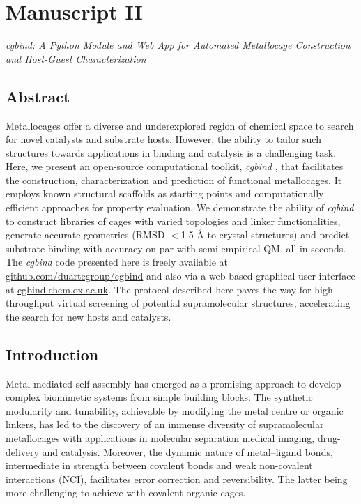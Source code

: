 \documentclass[../../main.tex]{subfiles}
\newcommand{\cgbind}{\emph{cgbind }}
\begin{document}
\section{Manuscript II}
\emph{cgbind: A Python Module and Web App for Automated Metallocage Construction and Host-Guest Characterization}


\subsection{Abstract}

Metallocages offer a diverse and underexplored region of chemical space to search for novel catalysts and substrate hosts. However, the ability to tailor such structures towards applications in binding and catalysis is a challenging task. Here, we present an open-source computational toolkit, \cgbind, that facilitates the construction, characterization and prediction of functional metallocages. It employs known structural scaffolds as starting points and computationally efficient approaches for property evaluation. We demonstrate the ability of \cgbind to construct libraries of cages with varied topologies and linker functionalities, generate accurate geometries (RMSD $<$1.5 Å to crystal structures) and predict substrate binding with accuracy on-par with semi-empirical QM, all in seconds. The \cgbind code presented here is freely available at {\url{github.com/duartegroup/cgbind}} and also via a web-based graphical user interface at \url{cgbind.chem.ox.ac.uk}. The protocol described here paves the way for high-throughput virtual screening of potential supramolecular structures, accelerating the search for new hosts and catalysts. 


\subsection{Introduction}

Metal-mediated self-assembly has emerged as a promising approach to develop complex biomimetic systems from simple building blocks. The synthetic modularity and tunability, achievable by modifying the metal centre or organic linkers, has led to the discovery of an immense diversity of supramolecular metallocages with applications in molecular separation\cite{Garcia-Simon2016, Chen2015} medical imaging,\cite{Pothig2019, Burke2018} drug-delivery\cite{Therrien2008, Zava2010, Lewis2012, Samanta2020, Sepehrpour2019, Casini2017} and catalysis.\cite{Fang2019} Moreover, the dynamic nature of metal–ligand bonds, intermediate in strength between covalent bonds and weak non-covalent interactions (NCI), facilitates error correction and reversibility.\cite{Desmarets2014, Chakrabarty2011} The latter being more challenging to achieve with covalent organic cages.\cite{Segura2019}
\end{document}

